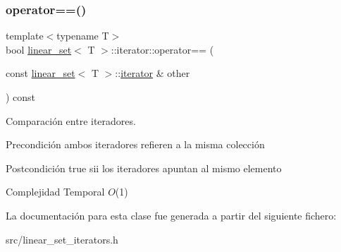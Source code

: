 \subsubsection{\texorpdfstring{operator==()}{operator==()}}
{\footnotesize\ttfamily template$<$typename T$>$ \\
bool \mbox{\hyperlink{classlinear__set}{linear\+\_\+set}}$<$ T $>$\+::iterator\+::operator== (\begin{DoxyParamCaption}\item[{const \mbox{\hyperlink{classlinear__set}{linear\+\_\+set}}$<$ T $>$\+::\mbox{\hyperlink{classlinear__set_1_1iterator}{iterator}} \&}]{other }\end{DoxyParamCaption}) const}



Comparación entre iteradores. 

\begin{DoxyPrecond}{Precondición}
ambos iteradores refieren a la misma colección 
\end{DoxyPrecond}
\begin{DoxyPostcond}{Postcondición}
true sii los iteradores apuntan al mismo elemento
\end{DoxyPostcond}

\begin{DoxyDescription}
\item[Complejidad Temporal]$O$(1)
\end{DoxyDescription}

La documentación para esta clase fue generada a partir del siguiente fichero\+:\begin{DoxyCompactItemize}
\item 
src/linear\+\_\+set\+\_\+iterators.\+h\end{DoxyCompactItemize}
